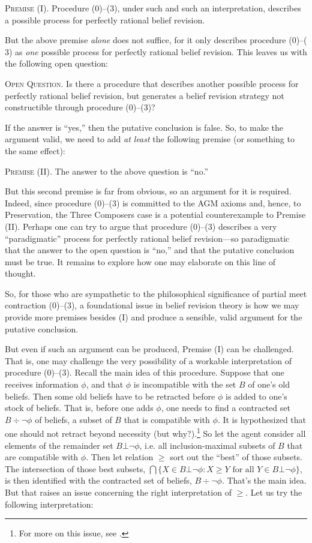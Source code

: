 	\xm \textsc{Premise (I).} Procedure ($0$)--($3$), under such and such an interpretation, describes a possible process for perfectly rational belief revision.

\ed But the above premise {\em alone} does not suffice, for it only describes procedure ($0$)--($3$) as {\em one} possible process for perfectly rational belief revision. This leaves us with the following open question: \op

	\xm \textsc{Open Question.} Is there a procedure that describes another possible process for perfectly rational belief revision, but generates a belief revision strategy not constructible through procedure ($0$)--($3$)? 

\ed 
If the answer is ``yes,'' then the putative conclusion is false. So, to make the argument valid, we need to add {\em at least} the following premise (or something to the same effect): \op

	\xm \textsc{Premise (II).} The answer to the above question is ``no.'' 

\ed But this second premise is far from obvious, so an argument for it is required. Indeed, since procedure ($0$)--($3$) is committed to the AGM axioms and, hence, to Preservation, the Three Composers case is a potential counterexample to Premise (II).  Perhaps one can try to argue that procedure ($0$)--($3$) describes a very ``paradigmatic'' process for perfectly rational belief revision---so paradigmatic that the answer to the open question is ``no,'' and that the putative conclusion must be true. It remains to explore how one may elaborate on this line of thought. 

So, for those who are sympathetic to the philosophical significance of partial meet contraction ($0$)--($3$), a foundational issue in belief revision theory is how we may provide more premises besides (I) and produce a sensible, valid argument for the putative conclusion.

But even if such an argument can be produced, Premise (I) can be challenged. That is, one may challenge the very possibility of a workable interpretation of procedure ($0$)--($3$). Recall the main idea of this procedure. Suppose that one receives information $\phi$, and that $\phi$ is incompatible with the set $B$ of one's old beliefs. Then some old beliefs have to be retracted before $\phi$ is added to one's stock of beliefs. That is, before one adds $\phi$, one needs to find a contracted set $B \div \neg\phi$ of beliefs, a subset of $B$ that is compatible with $\phi$. It is hypothesized that one should not retract beyond necessity (but why?).\footnote
	{For more on this issue, see \citet{rott2000two}.} 
So let the agent consider all elements of the remainder set $B\bot\neg\phi$, i.e. all inclusion-maximal subsets of $B$ that are compatible with $\phi$. Then let relation $\geq$  sort out the ``best'' of those subsets. The intersection of those best subsets, $\bigcap \{ X \in B\bot\neg\phi : X \ge Y \mbox{ for all } Y \in B\bot\neg\phi \}$, is then identified with the contracted set of beliefs, $B \div \neg\phi$. That's the main idea. But that raises an issue concerning the right interpretation of $\ge$. Let us try the following interpretation:\op

